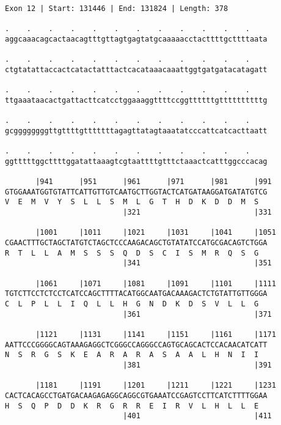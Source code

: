 \documentclass{article}
\begin{document}
\begin{Verbatim}[fontfamily=courier]
Exon 12 | Start: 131446 | End: 131824 | Length: 378

.    .    .    .    .    .    .    .    .    .    .    .    
aggcaaacagcactaacagtttgttagtgagtatgcaaaaacctacttttgcttttaata

.    .    .    .    .    .    .    .    .    .    .    .    
ctgtatattaccactcatactatttactcacataaacaaattggtgatgatacatagatt

.    .    .    .    .    .    .    .    .    .    .    .    
ttgaaataacactgattacttcatcctggaaaggttttccggttttttgttttttttttg

.    .    .    .    .    .    .    .    .    .    .    .    
gcggggggggttgttttgtttttttagagttatagtaaatatcccattcatcacttaatt

.    .    .    .    .    .    .    .    .    .    .    .    
ggtttttggcttttggatattaaagtcgtaattttgtttctaaactcatttggcccacag

       |941      |951      |961      |971      |981      |991
GTGGAAATGGTGTATTCATTGTTGTCAATGCTTGGTACTCATGATAAGGATGATATGTCG
V  E  M  V  Y  S  L  L  S  M  L  G  T  H  D  K  D  D  M  S  
                           |321                          |331

       |1001     |1011     |1021     |1031     |1041     |1051
CGAACTTTGCTAGCTATGTCTAGCTCCCAAGACAGCTGTATATCCATGCGACAGTCTGGA
R  T  L  L  A  M  S  S  S  Q  D  S  C  I  S  M  R  Q  S  G  
                           |341                          |351

       |1061     |1071     |1081     |1091     |1101     |1111
TGTCTTCCTCTCCTCATCCAGCTTTTACATGGCAATGACAAAGACTCTGTATTGTTGGGA
C  L  P  L  L  I  Q  L  L  H  G  N  D  K  D  S  V  L  L  G  
                           |361                          |371

       |1121     |1131     |1141     |1151     |1161     |1171
AATTCCCGGGGCAGTAAAGAGGCTCGGGCCAGGGCCAGTGCAGCACTCCACAACATCATT
N  S  R  G  S  K  E  A  R  A  R  A  S  A  A  L  H  N  I  I  
                           |381                          |391

       |1181     |1191     |1201     |1211     |1221     |1231
CACTCACAGCCTGATGACAAGAGAGGCAGGCGTGAAATCCGAGTCCTTCATCTTTTGGAA
H  S  Q  P  D  D  K  R  G  R  R  E  I  R  V  L  H  L  L  E  
                           |401                          |411

\end{Verbatim}
\newpage
\end{document}
